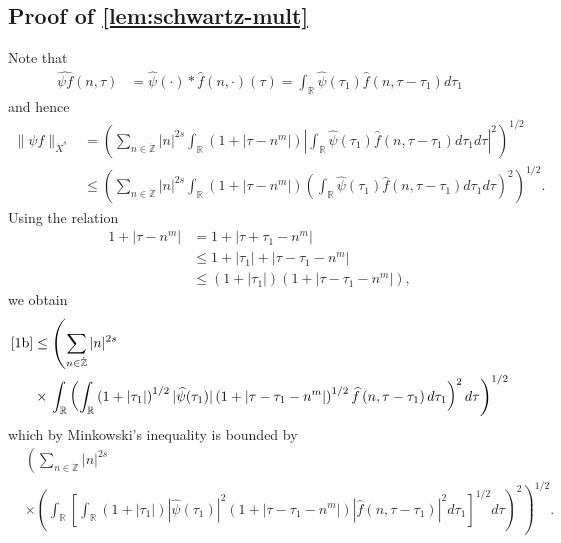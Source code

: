 \documentclass[12pt,reqno]{amsart}
\numberwithin{equation}{section}  %
\numberwithin{figure}{section}
\newcommand{\rr}{\mathbb{R}}
\newcommand{\zz}{\mathbb{Z}}
\newcommand{\zzdot}{\dot{\zz}}
\newcommand{\wh}{\widehat}
\theoremstyle{plain}
\theoremstyle{definition}
\theoremstyle{remark}
\begin{document}
\subsection{Proof of \autoref{lem:schwartz-mult}}
Note that
%
%
\begin{equation*}
	\begin{split}
		\wh{\psi f}\left( n, \tau \right)
		& = \wh{\psi}(\cdot) * \wh{f}(n,
		\cdot)(\tau)
		= \int_\rr \wh{\psi}(\tau_1) \wh{f} \left( n, \tau - \tau_1 \right) 
		d\tau_1
	\end{split}
\end{equation*}
%
%
and hence
%
%
\begin{equation}
	\label{1b}
	\begin{split}
		\|\psi f\|_{\dot{X}^s} 
		& = \left( \sum_{n \in \zzdot} |n|^{2s} \int_\rr \left( 1 + | \tau -
		n^{m} | \right) | \int_\rr \wh{\psi}(\tau_1) \wh{f}\left( n, \tau -
		\tau_1
		\right)  d \tau_1 d \tau |^2 \right)^{1/2}
		\\
		& \le \left( \sum_{n \in \zzdot} |n|^{2s} \int_\rr \left( 1 + | \tau -
		n^{m }
		|
		\right) \left( \int_\rr \wh{\psi}\left( \tau_1 \right) \wh{f}\left( n,
		\tau - \tau_1
		\right)  d \tau_1 d \tau \right)^2 \right)^{1/2}.
	\end{split}
\end{equation}
%
%
Using the relation
%
%
\begin{equation*}
	\begin{split}
		1 + | \tau - n^{m } |
		& = 1 + | \tau + \tau_1 - n^{m} |
		\\
		& \le 1 + | \tau_1 | + | \tau - \tau_1 - n^{m} |
		\\
		& \le \left( 1 + | \tau_1 | \right)\left( 1 + | \tau - \tau_1 -
		n^{m} | \right),
	\end{split}
\end{equation*}
%
%
we obtain
%
%
\begin{equation*}
	\begin{split}
		\eqref{1b}
		& \le \left( \sum_{n \in \zzdot} |n|^{2s} \right.
		\\
		& \times \left . \int_\rr \left(
		\int_\rr \left( 1 + | \tau_1 | \right)^{1/2} | \wh{\psi}(\tau_1) |
		\left( 1 + | \tau - \tau_1 - n^{m} | \right)^{1/2} \wh{f}\left( n, \tau
		- \tau_1
		\right)d \tau_1
		\right)^2 d \tau \right)^{1/2}
	\end{split}
\end{equation*}
%
%
which by Minkowski's inequality is bounded by
%
%
\begin{equation}
	\label{2b}
	\begin{split}
		& \left( \sum_{n \in \zzdot} |n|^{2s}  \right.
		\\
		& \times \left. \left( \int_\rr \left[ \int_\rr
		\left( 1 + | \tau_{1} | \right) | \wh{\psi}(\tau_1) |^2 \left( 1 + |
		\tau - \tau_1 - n^{m} |
		\right) | \wh{f}\left( n, \tau - \tau_1 \right) |^2 d \tau_1 
		\right]^{1/2} d \tau \right)^2 \right)^{1/2}.
	\end{split}
\end{equation}
\end{document}

